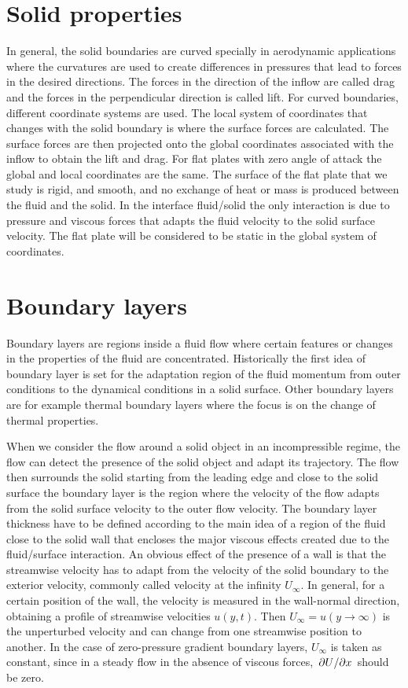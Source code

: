 \section{Solid properties}
In general, the solid boundaries are curved specially in aerodynamic applications where the curvatures are used to create differences in pressures that lead to forces in the desired directions. The forces in the direction of the inflow are called drag and the forces in the perpendicular direction is called lift. For curved boundaries, different coordinate systems are used. The local system of coordinates that changes with the solid boundary is where the surface forces are calculated. The surface forces are then projected onto the global coordinates associated with the inflow to obtain the lift and drag.
For flat plates with zero angle of attack the global and local coordinates are the same.
The surface of the flat plate that we study is rigid, and smooth, and no exchange of heat or mass is produced between the fluid and the solid. In the interface fluid/solid the only interaction is due to pressure and viscous forces that adapts the fluid velocity to the solid surface velocity.
The flat plate will be considered to be static in the global system of coordinates.


\section{Boundary layers}

Boundary layers are regions inside a fluid flow where certain features or changes in the properties of the fluid are concentrated. Historically the first idea of boundary layer is set for the adaptation region of the fluid momentum from outer conditions to the dynamical conditions in a solid surface.
Other boundary layers are for example thermal boundary layers where the focus is on the change of thermal properties.

When we consider the flow around a solid object in an incompressible regime, the flow can detect the presence of the solid object and adapt its trajectory. The flow then surrounds the solid starting from the leading edge and close to the solid surface the boundary layer is the region where the velocity of the flow adapts from the solid surface velocity to the outer flow velocity. The boundary layer thickness have to be defined according to the main idea of a region of the fluid close to the solid wall that encloses the major viscous effects created due to the fluid/surface interaction. An obvious effect of the presence of a wall is that the streamwise velocity has to adapt from the velocity of the solid boundary to the exterior velocity, commonly called velocity at the infinity $U_{\infty}$. 
In general, for a certain position of the wall, the velocity is measured in the wall-normal direction, obtaining a profile of streamwise velocities $u(y,t)$. Then $U_{\infty}=u(y\rightarrow \infty)$ is the unperturbed velocity and can change from one streamwise position to another.
In the case of zero-pressure gradient boundary layers, $U_{\infty}$ is taken as constant, since in a steady flow in the absence of viscous forces, $\pdv{U}/{x}$ should be zero. 


